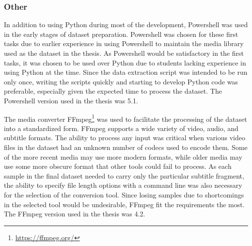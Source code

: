 \subsubsection{Other}
In addition to using Python during most of the development, Powershell was used in the early stages of dataset preparation.
Powershell was chosen for these first tasks due to earlier experience in using Powershell to maintain the media library used as the dataset in the thesis.
As Powershell would be satisfactory in the first tasks, it was chosen to be used over Python due to students lacking experience in using Python at the time.
Since the data extraction script was intended to be run only once, writing the scripts quickly and starting to develop Python code was preferable, especially given the expected time to process the dataset.
The Powershell version used in the thesis was 5.1.

The media converter FFmpeg\footnote{\url{https://ffmpeg.org/}} was used to facilitate the processing of the dataset into a standardized form.
FFmpeg supports a wide variety of video, audio, and subtitle formats.
The ability to process any input was critical when various video files in the dataset had an unknown number of codecs used to encode them.
Some of the more recent media may use more modern formats, while older media may use some more obscure format that other tools could fail to process.
As each sample in the final dataset needed to carry only the particular subtitle fragment, the ability to specify file length options with a command line was also necessary for the selection of the conversion tool.
Since losing samples due to shortcomings in the selected tool would be undesirable, FFmpeg fit the requirements the most.
The FFmpeg version used in the thesis was 4.2.




